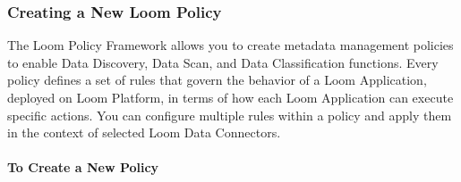 \documentclass[letterpaper,10pt,english]{sphinxmanual}
\begin{document}
\subsubsection{Creating a New Loom Policy}
\label{\detokenize{loom_getting_started_guide:creating-a-new-loom-policy}}
The Loom Policy Framework allows you to create metadata management policies to enable Data Discovery, Data Scan, and Data Classification functions. Every policy defines a set of rules that govern the behavior of a Loom Application, deployed on Loom Platform, in terms of how each Loom Application can execute specific actions. You can configure multiple rules within a policy and apply them in the context of selected Loom Data Connectors.


\paragraph{To Create a New Policy}
\end{document}
